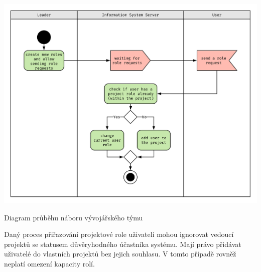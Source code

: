 \begin{fig:illustration}
   \includegraphics[width=1\textwidth]{images/dia-ak-role-assing.pdf}
   \caption[Diagram průběhu náboru týmu]{Diagram průběhu náboru vývojářského týmu}\label{pic:dia-ak-role-assing}
\end{fig:illustration}


Daný proces přiřazování projektové role uživateli mohou ignorovat vedoucí projektů se statusem důvěryhodného účastníka systému. Mají právo přidávat uživatelé do vlastních projektů bez jejich souhlasu. V tomto případě rovněž neplatí omezení kapacity rolí.
